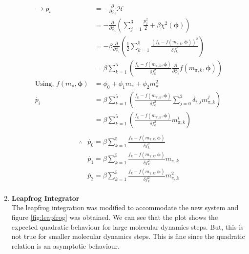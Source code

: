 \documentclass{article}
\begin{document}
\begin{enumerate}
\begin{align*}
    \rightarrow \dot{p_i} &= -\frac{\partial}{\partial\phi_i}\mathcal{H}\\
    &= -\frac{\partial}{\partial\phi_i} \left(\sum_{j=1}^3\frac{p_j^2}{2} + \beta\chi^2(\bm{\phi})\right)\\
    &= -\beta\frac{\partial}{\partial\phi_i} \left(\frac{1}{2} \sum_{k=1}^5 \frac{(f_k - f(m_{\pi,k},\bm{\phi}))^2}{\delta f_k^2}\right)\\
    &= \beta\sum_{k=1}^5\left(\frac{f_k - f(m_{\pi,k},\bm{\phi})}{\delta f_k^2} \frac{\partial}{\partial\phi_i}f(m_{\pi,k}, \bm{\phi})\right)\\
    \text{Using, } f(m_\pi, \bm{\phi}) &= \phi_0 + \phi_1 m_{\pi} + \phi_2 m_{\pi}^2\\
    \dot{p_i} &= \beta\sum_{k=1}^5\left(\frac{f_k - f(m_{\pi,k},\bm{\phi})}{\delta f_k^2}\sum_{j=0}^2\delta_{i,j}m_{\pi,k}^j\right)\\
    &= \beta\sum_{k=1}^5\left(\frac{f_k - f(m_{\pi,k},\bm{\phi})}{\delta f_k^2}m_{\pi,k}^i\right)\\
\end{align*}
\begin{equation}
\begin{split}
    \therefore &\boxed{\dot{p_0} = \beta\sum_{k=1}^5\frac{f_k - f(m_{\pi,k}, \bm{\phi})}{\delta f_k^2}}\\
    &\boxed{\dot{p_1} = \beta\sum_{k=1}^5\frac{f_k - f(m_{\pi,k}, \bm{\phi})}{\delta f_k^2}m_{\pi,k}}\\
    &\boxed{\dot{p_2} = \beta\sum_{k=1}^5\frac{f_k - f(m_{\pi,k}, \bm{\phi})}{\delta f_k^2}m_{\pi,k}^2}\\
\end{split}
\end{equation}

\item \textbf{Leapfrog Integrator}\\
The leapfrog integration was modified to accommodate the new system and figure \ref{fig:leapfrog} was obtained. We can see that the plot shows the expected quadratic behaviour for large molecular dynamics steps. But, this is not true for smaller molecular dynamics steps. This is fine since the quadratic relation is an asymptotic behaviour.\\


\end{enumerate}
\end{document}
